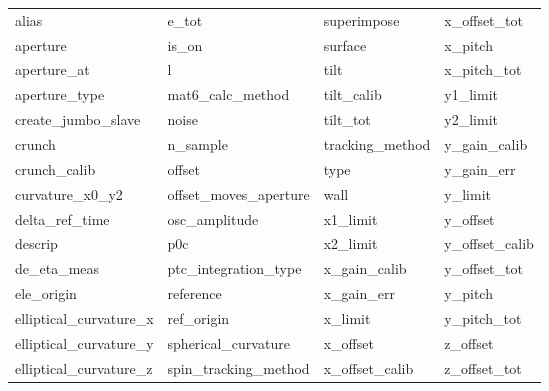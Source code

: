  \begin{tabular}{llll} \toprule
alias                       & e_tot                       & superimpose                 & x_offset_tot                \\
aperture                    & is_on                       & surface                     & x_pitch                     \\
aperture_at                 & l                           & tilt                        & x_pitch_tot                 \\
aperture_type               & mat6_calc_method            & tilt_calib                  & y1_limit                    \\
create_jumbo_slave          & noise                       & tilt_tot                    & y2_limit                    \\
crunch                      & n_sample                    & tracking_method             & y_gain_calib                \\
crunch_calib                & offset                      & type                        & y_gain_err                  \\
curvature_x0_y2             & offset_moves_aperture       & wall                        & y_limit                     \\
delta_ref_time              & osc_amplitude               & x1_limit                    & y_offset                    \\
descrip                     & p0c                         & x2_limit                    & y_offset_calib              \\
de_eta_meas                 & ptc_integration_type        & x_gain_calib                & y_offset_tot                \\
ele_origin                  & reference                   & x_gain_err                  & y_pitch                     \\
elliptical_curvature_x      & ref_origin                  & x_limit                     & y_pitch_tot                 \\
elliptical_curvature_y      & spherical_curvature         & x_offset                    & z_offset                    \\
elliptical_curvature_z      & spin_tracking_method        & x_offset_calib              & z_offset_tot                \\
 \bottomrule
 \end{tabular}
 \vfill
 
